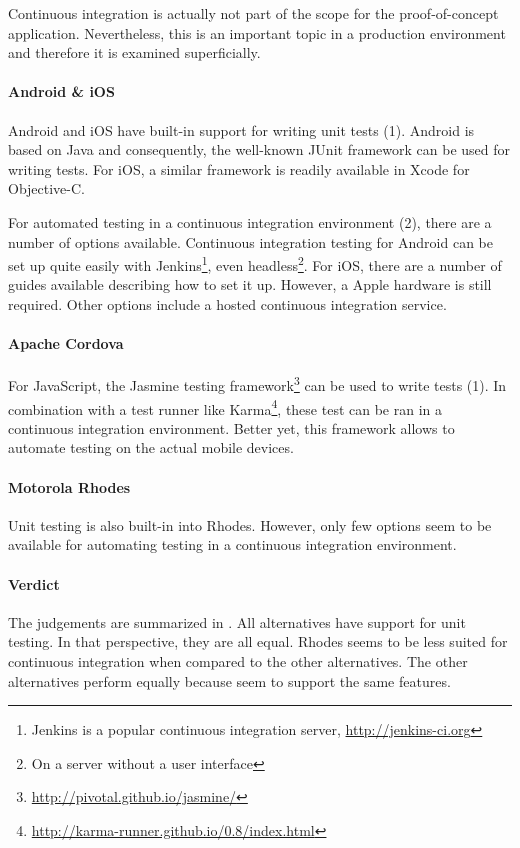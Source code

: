 Continuous integration is actually not part of the scope for the proof-of-concept application. Nevertheless, this is an important topic in a production environment and therefore it is examined superficially.

\paragraph{Android \& iOS} Android and iOS have built-in support for writing unit tests (1). Android is based on Java and consequently, the well-known JUnit framework can be used for writing tests. For iOS, a similar framework is readily available in Xcode for Objective-C. 

For automated testing in a continuous integration environment (2), there are a number of options available. Continuous integration testing for Android can be set up quite easily with Jenkins\footnote{Jenkins is a popular continuous integration server, \url{http://jenkins-ci.org}}, even headless\footnote{On a server without a user interface}. For iOS, there are a number of guides available describing how to set it up. However, a Apple hardware is still required. Other options include a hosted continuous integration service.

\paragraph{Apache Cordova} For JavaScript, the Jasmine testing framework\footnote{\url{http://pivotal.github.io/jasmine/}} can be used to write tests (1). In combination with a test runner like Karma\footnote{\url{http://karma-runner.github.io/0.8/index.html}}, these test can be ran in a continuous integration environment. Better yet, this framework allows to automate testing on the actual mobile devices.

\paragraph{Motorola Rhodes} Unit testing is also built-in into Rhodes. However, only few options seem to be available for automating testing in a continuous integration environment.

\paragraph{Verdict}  The judgements are summarized in . All alternatives have support for unit testing. In that perspective, they are all equal. Rhodes seems to be less suited for continuous integration when compared to the other alternatives. The other alternatives perform equally because seem to support the same features.

